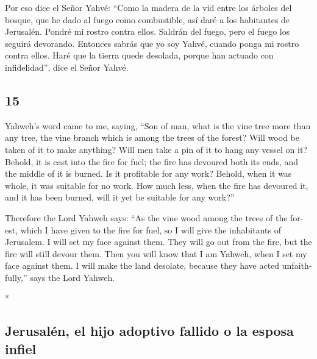 \begin{paracol}{2}
 Por eso dice el Señor Yahvé: ``Como la madera de la vid
entre los árboles del bosque, que he dado al fuego como combustible, así
daré a los habitantes de Jerusalén.  Pondré mi rostro
contra ellos. Saldrán del fuego, pero el fuego los seguirá devorando.
Entonces sabrás que yo soy Yahvé, cuando ponga mi rostro contra ellos.
 Haré que la tierra quede desolada, porque han actuado con
infidelidad'', dice el Señor Yahvé.

\switchcolumn
\begin{otherlanguage}{english}

\hypertarget{section-29}{%
\section{15}\label{section-29}}

 Yahweh's word came to me, saying,  ``Son of
man, what is the vine tree more than any tree, the vine branch which is
among the trees of the forest?  Will wood be taken of it
to make anything? Will men take a pin of it to hang any vessel on it?
 Behold, it is cast into the fire for fuel; the fire has
devoured both its ends, and the middle of it is burned. Is it profitable
for any work?  Behold, when it was whole, it was suitable
for no work. How much less, when the fire has devoured it, and it has
been burned, will it yet be suitable for any work?''

 Therefore the Lord Yahweh says: ``As the vine wood among
the trees of the forest, which I have given to the fire for fuel, so I
will give the inhabitants of Jerusalem.  I will set my
face against them. They will go out from the fire, but the fire will
still devour them. Then you will know that I am Yahweh, when I set my
face against them.  I will make the land desolate, because
they have acted unfaithfully,'' says the Lord Yahweh.

\end{otherlanguage}

\switchcolumn[0]*

\hypertarget{jerusaluxe9n-el-hijo-adoptivo-fallido-o-la-esposa-infiel}{%
\subsection{Jerusalén, el hijo adoptivo fallido o la esposa
infiel}\label{jerusaluxe9n-el-hijo-adoptivo-fallido-o-la-esposa-infiel}}


\end{paracol}
